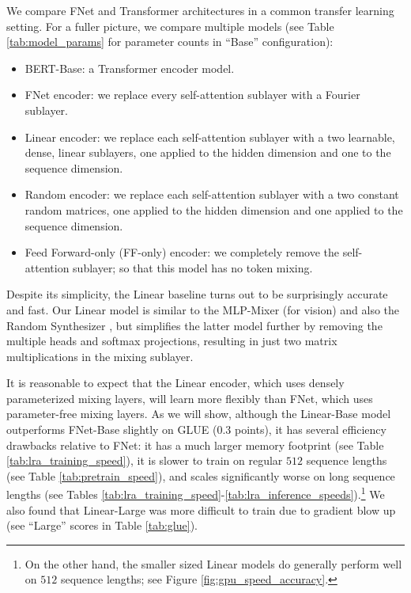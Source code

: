 \documentclass[11pt]{article}
\begin{document}
We compare FNet and Transformer architectures in a common transfer learning setting. For a fuller picture, we compare multiple models (see Table \ref{tab:model_params} for parameter counts in ``Base'' configuration): 
\begin{itemize}
    \item BERT-Base: a Transformer encoder model.
    \item FNet encoder: we replace every self-attention sublayer with a Fourier sublayer.
    \item Linear encoder: we replace each self-attention sublayer with a two learnable, dense, linear sublayers, one applied to the hidden dimension and one to the sequence dimension.
    \item Random encoder: we replace each self-attention sublayer with a two constant random matrices, one applied to the hidden dimension and one applied to the sequence dimension.
    \item Feed Forward-only (FF-only) encoder: we completely remove the self-attention sublayer; so that this model has no token mixing.
\end{itemize}


Despite its simplicity, the Linear baseline turns out to be surprisingly accurate and fast. Our Linear model is similar to the MLP-Mixer \citep{tolstikhin2021mlp} (for vision) and also the Random Synthesizer \citep{tay2020synthesizer}, but simplifies the latter model further by removing the multiple heads and softmax projections, resulting in just two matrix multiplications in the mixing sublayer. 


It is reasonable to expect that the Linear encoder, which uses densely parameterized mixing layers, will learn more flexibly than FNet, which uses parameter-free mixing layers. As we will show, although the Linear-Base model outperforms FNet-Base slightly on GLUE ($0.3$ points), it has several efficiency drawbacks relative to FNet: it has a much larger memory footprint (see Table \ref{tab:lra_training_speed}), it is slower to train on regular $512$ sequence lengths (see Table \ref{tab:pretrain_speed}), and scales significantly worse on long sequence lengths (see Tables \ref{tab:lra_training_speed}-\ref{tab:lra_inference_speeds}).\footnote{On the other hand, the smaller sized Linear models do generally perform well on $512$ sequence lengths; see Figure \ref{fig:gpu_speed_accuracy}.} We also found that Linear-Large was more difficult to train due to gradient blow up (see ``Large'' scores in Table \ref{tab:glue}).
\end{document}
